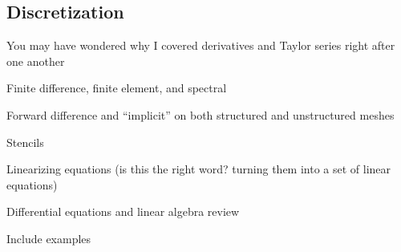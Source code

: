 \documentclass[a4paper,10pt]{scrartcl}
\begin{document}
\subsection{Discretization}

You may have wondered why I covered derivatives and Taylor series right after one another

Finite difference, finite element, and spectral

Forward difference and ``implicit''
on both structured and unstructured meshes

Stencils

Linearizing equations (is this the right word? turning them into a set of linear equations)

Differential equations and linear algebra review

Include examples
\end{document}
